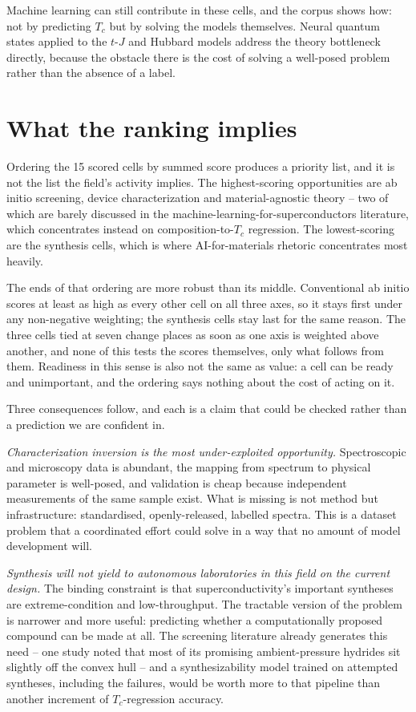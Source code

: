 \documentclass[
  11pt,
]{article}
\newcounter{none} %
\begin{document}
Machine learning can still contribute in these cells, and the corpus
shows how: not by predicting \(T_c\) but by solving the models
themselves. Neural quantum states applied to the \(t\)-\(J\) and Hubbard
models \citep{lange2024simulating, rende2026superconductivity} address
the theory bottleneck directly, because the obstacle there is the cost
of solving a well-posed problem rather than the absence of a label.

\section{What the ranking implies}\label{what-the-ranking-implies}

Ordering the 15 scored cells by summed score produces a priority list,
and it is not the list the field's activity implies. The highest-scoring
opportunities are ab initio screening, device characterization and
material-agnostic theory -- two of which are barely discussed in the
machine-learning-for-superconductors literature, which concentrates
instead on composition-to-\(T_c\) regression. The lowest-scoring are the
synthesis cells, which is where AI-for-materials rhetoric concentrates
most heavily.

The ends of that ordering are more robust than its middle. Conventional
ab initio scores at least as high as every other cell on all three axes,
so it stays first under any non-negative weighting; the synthesis cells
stay last for the same reason. The three cells tied at seven change
places as soon as one axis is weighted above another, and none of this
tests the scores themselves, only what follows from them. Readiness in
this sense is also not the same as value: a cell can be ready and
unimportant, and the ordering says nothing about the cost of acting on
it.

Three consequences follow, and each is a claim that could be checked
rather than a prediction we are confident in.

\emph{Characterization inversion is the most under-exploited
opportunity.} Spectroscopic and microscopy data is abundant, the mapping
from spectrum to physical parameter is well-posed, and validation is
cheap because independent measurements of the same sample exist. What is
missing is not method but infrastructure: standardised, openly-released,
labelled spectra. This is a dataset problem that a coordinated effort
could solve in a way that no amount of model development will.

\emph{Synthesis will not yield to autonomous laboratories in this field
on the current design.} The binding constraint is that
superconductivity's important syntheses are extreme-condition and
low-throughput. The tractable version of the problem is narrower and
more useful: predicting whether a computationally proposed compound can
be made at all. The screening literature already generates this need --
one study noted that most of its promising ambient-pressure hydrides sit
slightly off the convex hull \citep{cerqueira2024searching} -- and a
synthesizability model trained on attempted syntheses, including the
failures, would be worth more to that pipeline than another increment of
\(T_c\)-regression accuracy.
\end{document}
